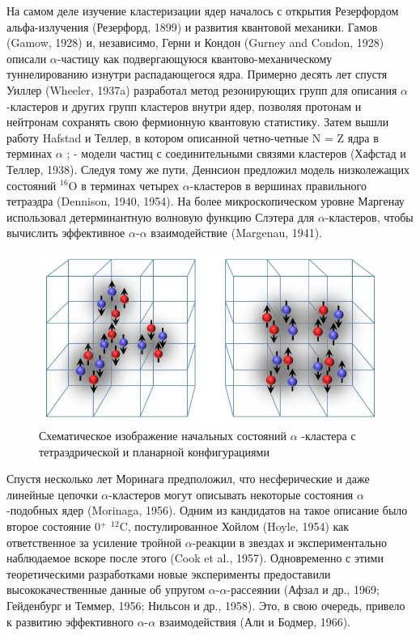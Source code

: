 \documentclass[fontsize=14pt]{scrreport}
\begin{document}
На самом деле изучение кластеризации ядер началось с открытия Резерфордом альфа-излучения (Резерфорд, 1899) и развития квантовой механики. Гамов (Gamow, 1928) и, независимо, Герни и Кондон (Gurney and Condon, 1928) описали $\alpha$-частицу как подвергающуюся квантово-механическому туннелированию изнутри распадающегося ядра. Примерно десять лет спустя Уиллер (Wheeler, 1937a) разработал метод резонирующих групп для описания $\alpha$-кластеров и других групп кластеров внутри ядер, позволяя протонам и нейтронам сохранять свою фермионную квантовую статистику. Затем вышли работу Hafstad и Теллер, в котором описанной четно-четные N = Z ядра в терминах  $\alpha$ ; - модели частиц с соединительными связями кластеров (Хафстад и Теллер, 1938). Следуя тому же пути, Деннсион предложил модель низколежащих состояний $^{16}$O в терминах четырех $\alpha$-кластеров в вершинах правильного тетраэдра (Dennison, 1940, 1954). На более микроскопическом уровне Маргенау использовал детерминантную волновую функцию Слэтера для $\alpha$-кластеров, чтобы вычислить эффективное $\alpha$-$\alpha$ взаимодействие (Margenau, 1941). 

\begin{figure}[!ht]
    \centerline{\includegraphics[scale=.7]{Picture13.png}}
    \caption{Схематическое изображение начальных состояний $\alpha$ -кластера с тетраэдрической и планарной конфигурациями}
    \label{fig14}
\end{figure}

Спустя несколько лет Моринага предположил, что несферические и даже линейные цепочки $\alpha$-кластеров могут описывать некоторые состояния $\alpha$-подобных ядер (Morinaga, 1956). Одним из кандидатов на такое описание было второе состояние 0$^{+}$ $^{12}$C, постулированное Хойлом (Hoyle, 1954) как ответственное за усиление тройной $\alpha$-реакции в звездах и экспериментально наблюдаемое вскоре после этого (Cook et al., 1957). Одновременно с этими теоретическими разработками новые эксперименты предоставили высококачественные данные об упругом $\alpha$-$\alpha$-рассеянии (Афзал и др., 1969; Гейденбург и Теммер, 1956; Нильсон и др., 1958). Это, в свою очередь, привело к развитию эффективного $\alpha$-$\alpha$ взаимодействия (Али и Бодмер, 1966). 
\end{document}
